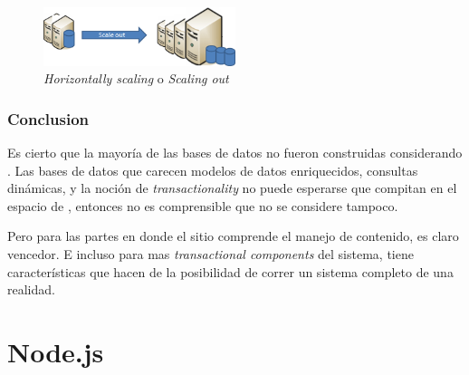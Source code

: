\begin{figure}[h!]
	\centering
	\includegraphics[width=0.5\textwidth]{figuras/cap2/scale_out.png}
	\caption{\textit{Horizontally scaling} o \textit{Scaling out} }
	\label{figure:figure_scale_out}
\end{figure}

\subsubsection{Conclusion}

Es cierto que la mayoría de las bases de datos  no fueron construidas considerando \ecommerce. Las bases de datos que carecen modelos de datos enriquecidos, consultas dinámicas, y la noción de \textit{transactionality} no puede esperarse que compitan en el espacio de \ecommerce, entonces no es comprensible que no se considere \mongodb tampoco.

Pero para las partes en donde el sitio \ecommerce comprende el manejo de contenido, \mongodb es claro vencedor. E incluso para mas \textit{transactional components} del sistema, \mongodb tiene características que hacen de la posibilidad de correr un sistema completo de \ecommerce una realidad.


\section{Node.js}


